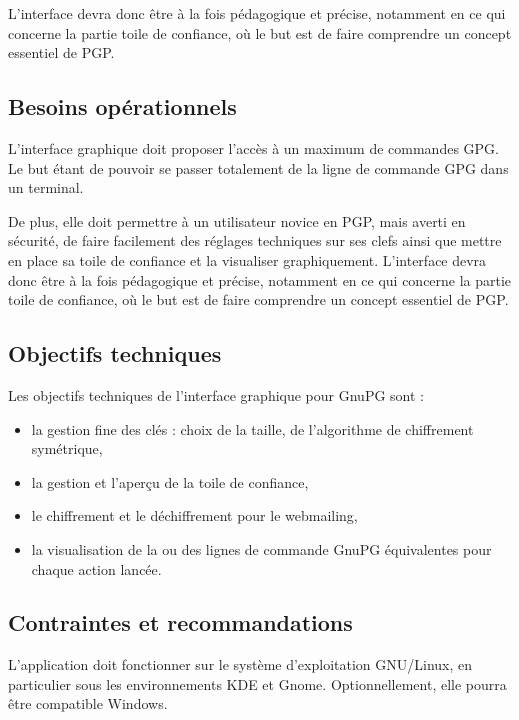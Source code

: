 \documentclass{../res/univ-projet}
\begin{document}
L'interface devra donc être à la fois pédagogique et précise, notamment en ce qui concerne la partie toile de confiance, où le but est de faire comprendre un concept essentiel de PGP.

\subsection{Besoins opérationnels}
L'interface graphique doit proposer l'accès à un maximum de commandes GPG. Le but étant de pouvoir se passer totalement de la ligne de commande GPG dans un terminal.

De plus, elle doit permettre à un utilisateur novice en PGP, mais averti en sécurité, de faire facilement des réglages techniques sur ses clefs ainsi que mettre en place sa toile de confiance et la visualiser graphiquement. L'interface devra donc être à la fois pédagogique et précise, notamment en ce qui concerne la partie toile de confiance, où le but est de faire comprendre un concept essentiel de PGP.

\subsection{Objectifs techniques}

Les objectifs techniques de l'interface graphique pour GnuPG sont :
\begin{itemize}
 \item la gestion fine des clés : choix de la taille, de l'algorithme de chiffrement symétrique,
 \item la gestion et l'aperçu de la toile de confiance,
 \item le chiffrement et le déchiffrement pour le webmailing,
 \item la visualisation de la ou des lignes de commande GnuPG équivalentes pour chaque action lancée.
\end{itemize}

\subsection{Contraintes et recommandations}

L'application doit fonctionner sur le système d'exploitation GNU/Linux, en particulier sous les environnements KDE et Gnome. Optionnellement, elle pourra être compatible Windows.
\end{document}
